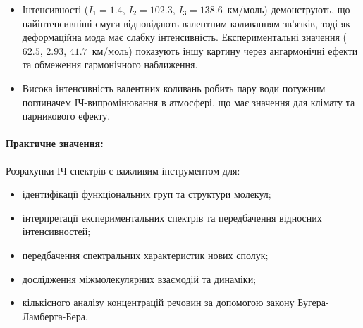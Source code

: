 \begin{itemize}
    \item Інтенсивності ($I_1 = 1.4$, $I_2 = 102.3$, $I_3 = 138.6$~км/моль)
          демонструють, що найінтенсивніші смуги відповідають валентним коливанням  зв'язків,
          тоді як деформаційна мода має слабку інтенсивність. Експериментальні значення
          ($62.5$, $2.93$, $41.7$~км/моль) показують іншу картину через ангармонічні ефекти
          та обмеження гармонічного наближення.

    \item Висока інтенсивність валентних коливань робить пару води потужним поглиначем
          ІЧ-випромінювання в атмосфері, що має значення для клімату та парникового ефекту.
\end{itemize}

\paragraph{Практичне значення:}
Розрахунки ІЧ-спектрів є важливим інструментом для:
\begin{itemize}
    \item ідентифікації функціональних груп та структури молекул;
    \item інтерпретації експериментальних спектрів та передбачення відносних інтенсивностей;
    \item передбачення спектральних характеристик нових сполук;
    \item дослідження міжмолекулярних взаємодій та динаміки;
    \item кількісного аналізу концентрацій речовин за допомогою закону Бугера-Ламберта-Бера.
\end{itemize}


